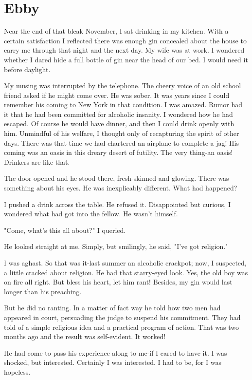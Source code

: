 \section{Ebby}

Near the end of that bleak November, I sat drinking in my kitchen.
With a certain satisfaction I reflected there was enough gin concealed about the house to carry me through that night and the next day.
My wife was at work.
I wondered whether I dared hide a full bottle of gin near the head of our bed.
I would need it before daylight.

My musing was interrupted by the telephone.
The cheery voice of an old school friend asked if he might come over.
He was sober.
It was years since I could remember his coming to New York in that condition.
I was amazed.
Rumor had it that he had been committed for alcoholic insanity.
I wondered how he had escaped.
Of course he would have dinner, and then I could drink openly with him.
Unmindful of his welfare, I thought only of recapturing the spirit of other days.
There was that time we had chartered an airplane to complete a jag!
His coming was an oasis in this dreary desert of futility.
The very thing-an oasis!
Drinkers are like that.

The door opened and he stood there, fresh-skinned and glowing.
There was something about his eyes.
He was inexplicably different.
What had happened?

I pushed a drink across the table.
He refused it.
Disappointed but curious, I wondered what had got into the fellow.
He wasn't himself.

"Come, what's this all about?" I queried.

He looked straight at me.
Simply, but smilingly, he said, "I've got religion."

I was aghast.
So that was it-last summer an alcoholic crackpot; now, I suspected, a little cracked about religion.
He had that starry-eyed look.
Yes, the old boy was on fire all right.
But bless his heart, let him rant!
Besides, my gin would last longer than his preaching.

But he did no ranting.
In a matter of fact way he told how two men had appeared in court, persuading the judge to suspend his commitment.
They had told of a simple religious idea and a practical program of action.
That was two months ago and the result was self-evident.
It worked!

He had come to pass his experience along to me-if I cared to have it.
I was shocked, but interested.
Certainly I was interested.
I had to be, for I was hopeless.

